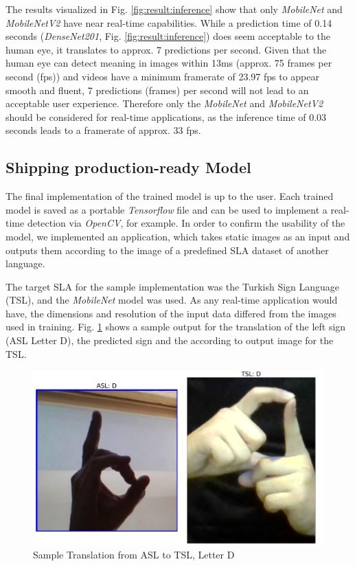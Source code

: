 The results visualized in Fig. \ref{fig:result:inference} show that only \textit{MobileNet} and \textit{MobileNetV2} have near real-time capabilities. While a prediction time of 0.14 seconds (\textit{DenseNet201}, Fig. \ref{fig:result:inference}) does seem acceptable to the human eye, it translates to approx. 7 predictions per second. Given that the human eye can detect meaning in images within 13ms\cite{Potter2014} (approx. 75 frames per second (fps)) and videos have a minimum framerate of 23.97 fps to appear smooth and fluent, 7 predictions (frames) per second will not lead to an acceptable user experience. Therefore only the \textit{MobileNet} and \textit{MobileNetV2} should be considered for real-time applications, as the inference time of 0.03 seconds leads to a framerate of approx. 33 fps.

\subsection{Shipping production-ready Model}
The final implementation of the trained model is up to the user. Each trained model is saved as a portable \textit{Tensorflow} file and can be used to implement a real-time detection via \textit{OpenCV}, for example. In order to confirm the usability of the model, we implemented an application, which takes static images as an input and outputs them according to the image of a predefined SLA dataset of another language. 

The target SLA for the sample implementation was the Turkish Sign Language (TSL), and the \textit{MobileNet} model was used. As any real-time application would have, the dimensions and resolution of the input data differed from the images used in training. Fig. \ref{fig:result:translation} shows a sample output for the translation of the left sign (ASL Letter D), the predicted sign and the according to output image for the TSL.

\begin{figure}[h]
    \centering
    \caption{Sample Translation from ASL to TSL, Letter D}
	\label{fig:result:translation}
    \includegraphics[width=\linewidth]{figures/sample_translate_D_tur.png}
\end{figure}